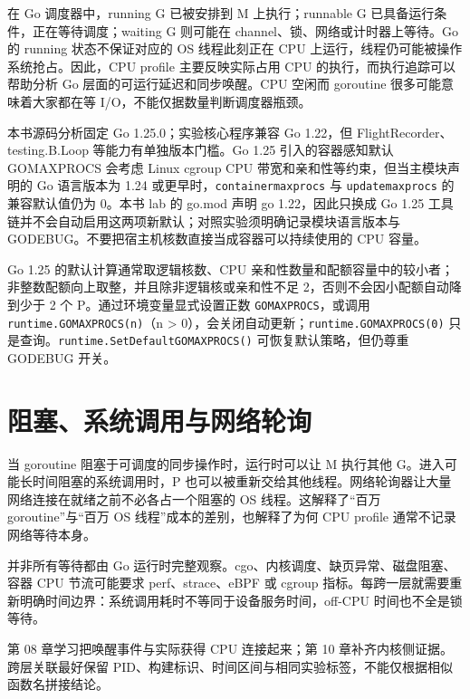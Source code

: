 \documentclass[UTF8,fontset=fandol,openany,11pt]{ctexbook}
\begin{document}
在 Go 调度器中，running G 已被安排到 M 上执行；runnable G 已具备运行条件，正在等待调度；waiting G 则可能在 channel、锁、网络或计时器上等待。Go 的 running 状态不保证对应的 OS 线程此刻正在 CPU 上运行，线程仍可能被操作系统抢占。因此，CPU profile 主要反映实际占用 CPU 的执行，而执行追踪可以帮助分析 Go 层面的可运行延迟和同步唤醒。CPU 空闲而 goroutine 很多可能意味着大家都在等 I/O，不能仅据数量判断调度器瓶颈。

本书源码分析固定 Go 1.25.0；实验核心程序兼容 Go 1.22，但 FlightRecorder、testing.B.Loop 等能力有单独版本门槛。Go 1.25 引入的容器感知默认 GOMAXPROCS 会考虑 Linux cgroup CPU 带宽和亲和性等约束，但当主模块声明的 Go 语言版本为 1.24 或更早时，\texttt{containerm\allowbreak{}axprocs} 与 \texttt{updatemaxp\allowbreak{}rocs} 的兼容默认值仍为 0。本书 lab 的 go.mod 声明 go 1.22，因此只换成 Go 1.25 工具链并不会自动启用这两项新默认；对照实验须明确记录模块语言版本与 GODEBUG。不要把宿主机核数直接当成容器可以持续使用的 CPU 容量。

Go 1.25 的默认计算通常取逻辑核数、CPU 亲和性数量和配额容量中的较小者；非整数配额向上取整，并且除非逻辑核或亲和性不足 2，否则不会因小配额自动降到少于 2 个 P。通过环境变量显式设置正数 \texttt{GOMAXPROCS}，或调用 \texttt{runtime.\allowbreak{}GOMAXPROCS(n)}（n > 0），会关闭自动更新；\texttt{runtime.\allowbreak{}GOMAXPROCS(0)} 只是查询。\texttt{runtime.\allowbreak{}SetDefault\allowbreak{}GOMAXPROCS()} 可恢复默认策略，但仍尊重 GODEBUG 开关。\cite{tools-go125}

\section{阻塞、系统调用与网络轮询}
当 goroutine 阻塞于可调度的同步操作时，运行时可以让 M 执行其他 G。进入可能长时间阻塞的系统调用时，P 也可以被重新交给其他线程。网络轮询器让大量网络连接在就绪之前不必各占一个阻塞的 OS 线程。这解释了“百万 goroutine”与“百万 OS 线程”成本的差别，也解释了为何 CPU profile 通常不记录网络等待本身。

并非所有等待都由 Go 运行时完整观察。cgo、内核调度、缺页异常、磁盘阻塞、容器 CPU 节流可能要求 perf、strace、eBPF 或 cgroup 指标。每跨一层就需要重新明确时间边界：系统调用耗时不等同于设备服务时间，off-CPU 时间也不全是锁等待。

第 08 章学习把唤醒事件与实际获得 CPU 连接起来；第 10 章补齐内核侧证据。跨层关联最好保留 PID、构建标识、时间区间与相同实验标签，不能仅根据相似函数名拼接结论。
\end{document}
